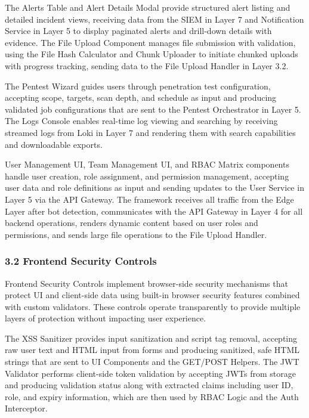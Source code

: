 \documentclass[12pt,a4paper]{report}
\begin{document}
The Alerts Table and Alert Details Modal provide structured alert listing and detailed incident views, receiving data from the SIEM in Layer 7 and Notification Service in Layer 5 to display paginated alerts and drill-down details with evidence. The File Upload Component manages file submission with validation, using the File Hash Calculator and Chunk Uploader to initiate chunked uploads with progress tracking, sending data to the File Upload Handler in Layer 3.2.

The Pentest Wizard guides users through penetration test configuration, accepting scope, targets, scan depth, and schedule as input and producing validated job configurations that are sent to the Pentest Orchestrator in Layer 5. The Logs Console enables real-time log viewing and searching by receiving streamed logs from Loki in Layer 7 and rendering them with search capabilities and downloadable exports.

User Management UI, Team Management UI, and RBAC Matrix components handle user creation, role assignment, and permission management, accepting user data and role definitions as input and sending updates to the User Service in Layer 5 via the API Gateway. The framework receives all traffic from the Edge Layer after bot detection, communicates with the API Gateway in Layer 4 for all backend operations, renders dynamic content based on user roles and permissions, and sends large file operations to the File Upload Handler.

\subsubsection{3.2 Frontend Security Controls}

Frontend Security Controls implement browser-side security mechanisms that protect UI and client-side data using built-in browser security features combined with custom validators. These controls operate transparently to provide multiple layers of protection without impacting user experience.

The XSS Sanitizer provides input sanitization and script tag removal, accepting raw user text and HTML input from forms and producing sanitized, safe HTML strings that are sent to UI Components and the GET/POST Helpers. The JWT Validator performs client-side token validation by accepting JWTs from storage and producing validation status along with extracted claims including user ID, role, and expiry information, which are then used by RBAC Logic and the Auth Interceptor.
\end{document}
